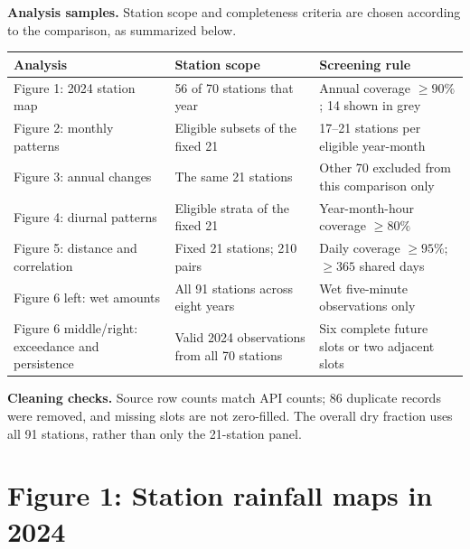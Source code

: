 \documentclass[UTF8,fontset=fandol,10pt,a4paper,landscape]{ctexart}
\begin{document}
\textbf{Analysis samples.} Station scope and completeness criteria are chosen according to the comparison, as summarized below.
\begin{center}\begin{tabular}{p{7.0cm}p{6.8cm}p{10.5cm}}
\toprule
Analysis & Station scope & Screening rule\\\midrule
Figure 1: 2024 station map & 56 of 70 stations that year & Annual coverage $\geq90\%$; 14 shown in grey\\
Figure 2: monthly patterns & Eligible subsets of the fixed 21 & 17--21 stations per eligible year-month\\
Figure 3: annual changes & The same 21 stations & Other 70 excluded from this comparison only\\
Figure 4: diurnal patterns & Eligible strata of the fixed 21 & Year-month-hour coverage $\geq80\%$\\
Figure 5: distance and correlation & Fixed 21 stations; 210 pairs & Daily coverage $\geq95\%$; $\geq365$ shared days\\
Figure 6 left: wet amounts & All 91 stations across eight years & Wet five-minute observations only\\
Figure 6 middle/right: exceedance and persistence & Valid 2024 observations from all 70 stations & Six complete future slots or two adjacent slots\\
\bottomrule\end{tabular}\end{center}

\textbf{Cleaning checks.} Source row counts match API counts; 86 duplicate records were removed, and missing slots are not zero-filled. The overall dry fraction uses all 91 stations, rather than only the 21-station panel.

\clearpage\section*{Figure 1: Station rainfall maps in 2024}
\end{document}
